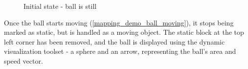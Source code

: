 \begin{figure}[!ht]
    \centering
    \caption{Initial state - ball is still}
    \label{mapping_demo_start}
\end{figure}

Once the ball starts moving (\ref{mapping_demo_ball_moving}), it stops being marked as static, but is handled as a moving object. The static block at the top left corner has been removed, and the ball is displayed using the dynamic visualization toolset - a sphere and an arrow, representing the ball's area and speed vector.

